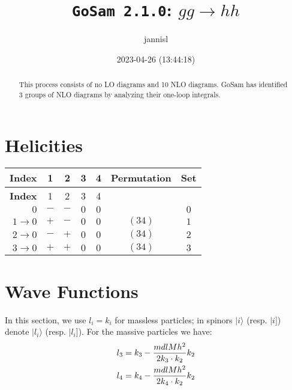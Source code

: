 \documentclass[a4paper]{article}
\title{\texttt{GoSam 2.1.0}: ${g}{g}\rightarrow{h}{h}$}
\author{jannisl}
\date{2023-04-26 (13:44:18)}
\newcommand{\kea}[1]{\vert #1 \rangle}
\newcommand{\keb}[1]{\vert #1 ]}
\begin{document}
\maketitle
\begin{abstract}
\noindent This process consists of no LO diagrams and 10 NLO diagrams. GoSam has identified 3 groups  of NLO diagrams by analyzing their one-loop integrals.
\end{abstract}
\newpage
\tableofcontents
\newpage

\section{Helicities}

\begin{longtable}[c]{r|cccc|c|c}
\bf{Index} &1&2&3&4 & Permutation & Set\\
\hline
\endfirsthead
\bf{Index} &1&2&3&4\\
\hline
\endhead 
$0$& $-$& $-$& $0$& $0$ &  & $0$ \\
$1\rightarrow 0$& $+$& $-$& $0$& $0$ & $(34)$ & $1$ \\
$2\rightarrow 0$& $-$& $+$& $0$& $0$ & $(34)$ & $2$ \\
$3\rightarrow 0$& $+$& $+$& $0$& $0$ & $(34)$ & $3$ \\
\end{longtable}
\section{Wave Functions}
In this section, we use $l_i=k_i$ for massless particles;
in spinors $\kea{i}$ (resp. $\keb{i}$) denote $\kea{l_i}$ (resp. $\keb{l_i}$).
For the massive particles we have:
\begin{align}
l_{3} &= k_{3} - \frac{mdlMh^2}{%
      2 k_{3}\cdot k_{2}}k_{2}\\
l_{4} &= k_{4} - \frac{mdlMh^2}{%
      2 k_{4}\cdot k_{2}}k_{2}
\end{align}
\end{document}
